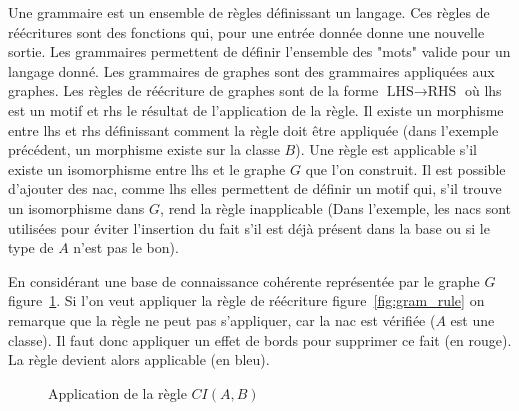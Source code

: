 Une grammaire est un ensemble de règles définissant un langage.
Ces règles de réécritures sont des fonctions qui, pour une entrée donnée donne une nouvelle sortie.
Les grammaires permettent de définir l'ensemble des "mots" valide pour un langage donné.
Les grammaires de graphes sont des grammaires appliquées aux graphes.
Les règles de réécriture de graphes sont de la forme $\text{LHS} \to \text{RHS}$ où \gls{lhs} est un motif et \gls{rhs} le résultat de l'application de la règle.
Il existe un morphisme entre \gls{lhs} et \gls{rhs} définissant comment la règle doit être appliquée (dans l'exemple précédent, un morphisme existe sur la classe $B$).
Une règle est applicable s'il existe un isomorphisme entre \gls{lhs} et le graphe $G$ que l'on construit.
Il est possible d'ajouter des \gls{nac}, comme \gls{lhs} elles permettent de définir un motif qui, s'il trouve un isomorphisme dans $G$, rend la règle inapplicable (Dans l'exemple, les \gls{nac}s sont utilisées pour éviter l'insertion du fait s'il est déjà présent dans la base ou si le type de $A$ n'est pas le bon).

\begin{example}
    En considérant une base de connaissance cohérente représentée par le graphe $G$ figure~\ref{fig:rule_ci}.
    Si l'on veut appliquer la règle de réécriture figure~\ref{fig:gram_rule} on remarque que la règle ne peut pas s'appliquer, car la \gls{nac} est vérifiée ($A$ est une classe).
    Il faut donc appliquer un effet de bords pour supprimer ce fait (en rouge).
    La règle devient alors applicable (en bleu).
\end{example}

\begin{figure}
    \centering
    \begin{subfigure}[b]{.45\textwidth}
        \centering
    \end{subfigure}
    \raisebox{1.5cm}{\scalebox{1.5}{$\longrightarrow$}}
    \begin{subfigure}[b]{.45\textwidth}
        \centering
    \end{subfigure}
    \caption{Application de la règle $CI(A,B)$}
    \label{fig:rule_ci}
\end{figure}

